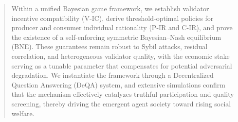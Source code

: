 \documentclass{article}
\begin{document}
\begin{abstract}
\vspace{1.5mm}

Within a unified Bayesian game framework, we establish validator incentive compatibility (V-IC), derive threshold-optimal policies for producer and consumer individual rationality (P-IR and C-IR), and prove the existence of a self-enforcing symmetric Bayesian–Nash equilibrium (BNE). These guarantees remain robust to Sybil attacks, residual correlation, and heterogeneous validator quality, with the economic stake serving as a tunable parameter that compensates for potential adversarial degradation. We instantiate the framework through a Decentralized Question Answering (DeQA) system, and extensive simulations confirm that the mechanism effectively catalyzes truthful participation and quality screening, thereby driving the emergent agent society toward rising social welfare.

\end{abstract}
\newpage



















\newpage
{}

\end{document}
